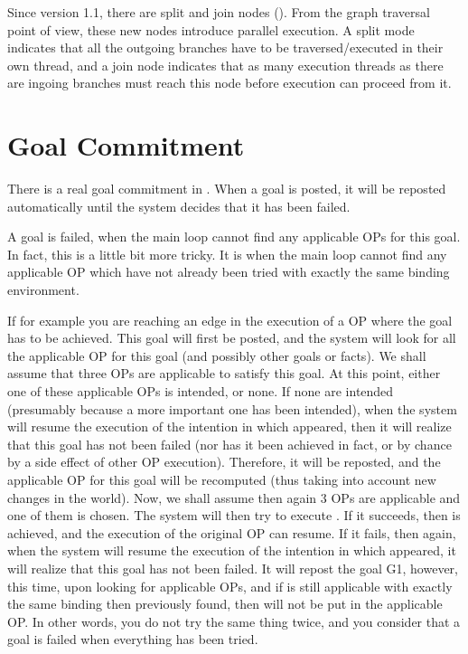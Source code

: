 Since version 1.1, there are split and join nodes ().  From the graph traversal point of view, these new nodes introduce
parallel execution. A split mode indicates that all the outgoing branches have
to be traversed/executed in their own thread, and a join node indicates that as
many execution threads as there are ingoing branches must reach this node
before execution can proceed from it.


\section{Goal Commitment}

There is a real goal commitment in \COPRS{}. When a goal is posted, it will be
reposted automatically until the system decides that it has been failed.

A goal is failed, when the main loop cannot find any applicable OPs
for this goal. In fact, this is a little bit more tricky. It is when the
main loop cannot find any applicable OP which have not already been tried
with exactly the same binding environment.

If for example you are reaching an edge in the execution of a OP where the goal
 has to be achieved. This goal will first be posted, and the system
will look for all the applicable OP for this goal (and possibly other goals or
facts). We shall assume that three OPs are applicable to satisfy this goal. At this
point, either one of these applicable OPs is intended, or none. If none are
intended (presumably because a more important one has been intended), when the
system will resume the execution of the intention in which  appeared,
then it will realize that this goal has not been failed (nor has it been
achieved in fact, or by chance by a side effect of other OP execution).
Therefore, it will be reposted, and the applicable OP for this goal will be
recomputed (thus taking into account new changes in the world). Now, we shall
assume then again 3 OPs are applicable and  one of them is chosen.
The system will then try to execute . If it succeeds, then 
is achieved, and the execution of the original OP can resume. If it fails, then
again, when the system will resume the execution of the intention in which
 appeared, it will realize that this goal has not been failed. It
will repost the goal G1, however, this time, upon looking for applicable OPs,
and if  is still applicable with exactly the same binding then
previously found, then  will not be put in the applicable OP. In
other words, you do not try the same thing twice, and you consider that a goal
is failed when everything has been tried.

